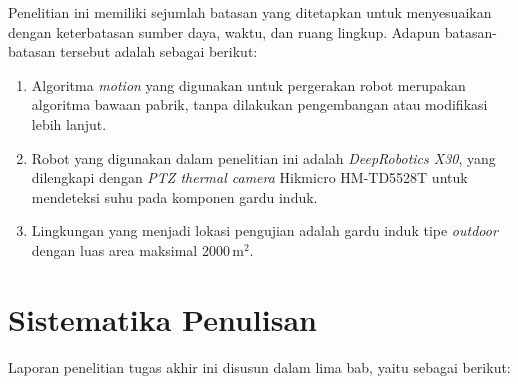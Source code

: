 Penelitian ini memiliki sejumlah batasan yang ditetapkan untuk menyesuaikan dengan keterbatasan sumber daya, waktu, dan ruang lingkup. Adapun batasan-batasan tersebut adalah sebagai berikut:
\begin{enumerate}
    \item Algoritma \emph{motion} yang digunakan untuk pergerakan robot merupakan algoritma bawaan pabrik, tanpa dilakukan pengembangan atau modifikasi lebih lanjut.
    
    \item Robot yang digunakan dalam penelitian ini adalah \emph{DeepRobotics X30}, yang dilengkapi dengan \emph{PTZ thermal camera} Hikmicro HM-TD5528T untuk mendeteksi suhu pada komponen gardu induk.
    
    \item Lingkungan yang menjadi lokasi pengujian adalah gardu induk tipe \emph{outdoor} dengan luas area maksimal 2000\,m$^2$.
\end{enumerate}


\section{Sistematika Penulisan}
\label{sec:sistematikapenulisan}

Laporan penelitian tugas akhir ini disusun dalam lima bab, yaitu sebagai berikut:

